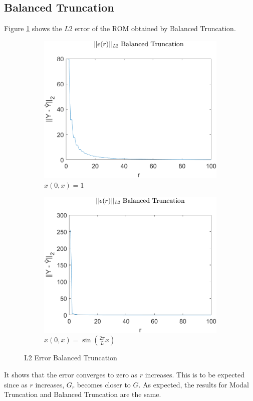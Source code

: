 \subsection{Balanced Truncation}
Figure \ref{FIG-ERR-BT} shows the \(L2\) error of the ROM obtained by Balanced Truncation.
\begin{figure}[H]
\begin{subfigure}[b]{0.5\textwidth}
\centering
\includegraphics[width=\textwidth]{images/L2_BT}
\caption{$x(0, x) = 1$}
\label{FIG-ERR-BT}
\end{subfigure}
\begin{subfigure}[b]{0.5\textwidth}
\centering
\includegraphics[width=\textwidth]{images/L2_BT_SIN}
\caption{$x(0, x) = \sin(\frac{2\pi}{L}x)$}
\label{FIG-ERR-BT-SIN}
\end{subfigure}
\caption{L2 Error Balanced Truncation}
\end{figure}
It shows that the error converges to zero as \(r\) increases.
This is to be expected since as \(r\) increases, \(G_r\) becomes closer to \(G\).
As expected, the results for Modal Truncation and Balanced Truncation are the same.


